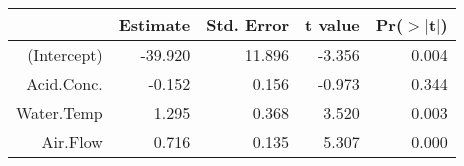 \begin{table}[ht]
\centering
\begin{tabular}{rrrrr}
  \hline
 & Estimate & Std. Error & t value & Pr($>$$|$t$|$) \\ 
  \hline
(Intercept) & -39.920 & 11.896 & -3.356 & 0.004 \\ 
  Acid.Conc. & -0.152 & 0.156 & -0.973 & 0.344 \\ 
  Water.Temp & 1.295 & 0.368 & 3.520 & 0.003 \\ 
  Air.Flow & 0.716 & 0.135 & 5.307 & 0.000 \\ 
   \hline
\end{tabular}
\end{table}
